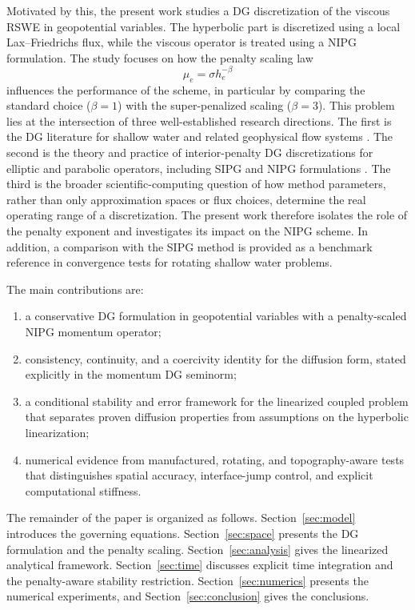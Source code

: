 \documentclass[pdflatex,sn-mathphys-num]{sn-jnl}%
\theoremstyle{thmstyleone}%
\theoremstyle{thmstyletwo}%
\theoremstyle{thmstylethree}%
\begin{document}
Motivated by this, the present work studies a DG discretization of the viscous RSWE in geopotential variables. The hyperbolic part is discretized using a local Lax--Friedrichs flux, while the viscous operator is treated using a NIPG formulation. The study focuses on how the penalty scaling law
\[
\mu_e=\sigma h_e^{-\beta}
\]
influences the performance of the scheme, in particular by comparing the standard choice ($\beta=1$) with the super-penalized scaling ($\beta=3$).
This problem lies at the intersection of three well-established research directions. The first is the DG literature for shallow water and related geophysical flow systems \cite{ref_article6, ref_article3,ref_article5, ref_article1}. The second is the theory and practice of interior-penalty DG discretizations for elliptic and parabolic operators, including SIPG and NIPG formulations \cite{ref_article7,ref_article2,ref_article4}. The third is the broader scientific-computing question of how method parameters, rather than only approximation spaces or flux choices, determine the real operating range of a discretization.
The present work therefore isolates the role of the penalty exponent and investigates its impact on the NIPG scheme. In addition, 
a comparison with the SIPG method is provided as a benchmark reference in convergence tests for rotating shallow water problems.

The main contributions are:
\begin{enumerate}[leftmargin=2em]
\item a conservative DG formulation in geopotential variables with a penalty-scaled NIPG momentum operator;
\item consistency, continuity, and a coercivity identity for the diffusion form, stated explicitly in the momentum DG seminorm;
\item a conditional stability and error framework for the linearized coupled problem that separates proven diffusion properties from assumptions on the hyperbolic linearization;
\item numerical evidence from manufactured, rotating, and topography-aware tests that distinguishes spatial accuracy, interface-jump control, and explicit computational stiffness.
\end{enumerate}

The remainder of the paper is organized as follows. Section~\ref{sec:model} introduces the governing equations. Section~\ref{sec:space} presents the DG formulation and the penalty scaling. Section~\ref{sec:analysis} gives the linearized analytical framework. Section~\ref{sec:time} discusses explicit time integration and the penalty-aware stability restriction. Section~\ref{sec:numerics} presents the numerical experiments, and Section~\ref{sec:conclusion} gives the conclusions.
\end{document}
